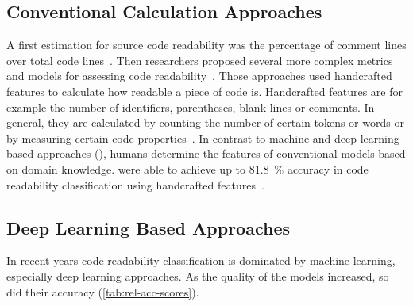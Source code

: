 \documentclass[%
class=scrreprt,
chapterprefix=false,%
open=right,%
twoside=false,%
paper=a4,%
logofile={Logo\_zentral\_farbig\_EN.png},%
thesistype=master,%
UKenglish,%
]{se2thesis}
\theoremstyle{definition}
\begin{document}
	
\subsection{Conventional Calculation Approaches} \label{Conventional Calculation Approaches}
	A first estimation for source code readability was the percentage of comment lines over total code lines~\cite{aggarwal2002integrated}. Then researchers proposed several more complex metrics and models for assessing code readability~\cite{buse2009learning, posnett2011simpler, dorn2012general, scalabrino2018comprehensive}.
	Those approaches used handcrafted features to calculate how readable a piece of code is.
	Handcrafted features are for example the number of identifiers, parentheses, blank lines or comments. In general, they are calculated by counting the number of certain tokens or words or by measuring certain code properties~\cite{scalabrino2018comprehensive}.
	In contrast to machine and deep learning-based approaches (), humans determine the features of conventional models based on domain knowledge.
	\citeauthor{scalabrino2018comprehensive} were able to achieve up to 81.8~\% accuracy in code readability classification using handcrafted features~\cite{scalabrino2018comprehensive}.
	
\subsection{Deep Learning Based Approaches} \label{Deep Learning Based Approaches}
	In recent years code readability classification is dominated by machine learning, especially deep learning approaches. As the quality of the models increased, so did their accuracy (\autoref{tab:rel-acc-scores}).
	
\end{document}
